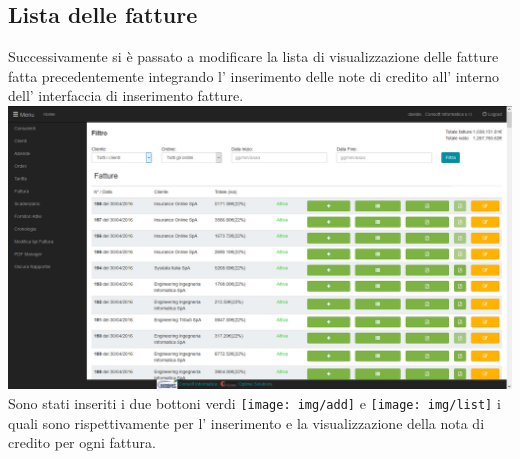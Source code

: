 \documentclass[12pt]{book}
\begin{document}
\subsection{Lista delle fatture}
Successivamente si è passato a modificare la lista di visualizzazione delle 
fatture fatta precedentemente 
integrando l' inserimento delle note di credito all' interno dell' interfaccia 
di inserimento fatture.
\newline
\newline
\includegraphics[scale=0.4]{img/lista_fatture}
\newline
Sono stati inseriti i due bottoni verdi \texttt{[image: img/add]} e 
\texttt{[image: img/list]} i quali sono rispettivamente per l' inserimento e 
la visualizzazione della nota di credito per ogni fattura.
\end{document}
